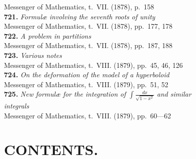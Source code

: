 \documentclass[12pt,a4paper,oneside]{book}
\theoremstyle{plain}
\theoremstyle{definition}
\theoremstyle{remark}
\begin{document}
\hspace*{2em}Messenger of Mathematics, t.~VII. (1878), p.~158\\[0.3em]
\textbf{721.} \textit{Formul\ae{} involving the seventh roots of unity} \\
\hspace*{2em}Messenger of Mathematics, t.~VII. (1878), pp.~177, 178\\[0.3em]
\textbf{722.} \textit{A problem in partitions} \\
\hspace*{2em}Messenger of Mathematics, t.~VII. (1878), pp.~187, 188\\[0.3em]
\textbf{723.} \textit{Various notes} \\
\hspace*{2em}Messenger of Mathematics, t.~VIII. (1879), pp.~45, 46, 126\\[0.3em]
\textbf{724.} \textit{On the deformation of the model of a hyperboloid} \\
\hspace*{2em}Messenger of Mathematics, t.~VIII. (1879), pp.~51, 52\\[0.3em]
\textbf{725.} \textit{New formul\ae{} for the integration of $\int \frac{dx}{\sqrt{1-x^2}}$ and similar}\\
\hspace*{2em}\textit{integrals} \\
\hspace*{2em}Messenger of Mathematics, t.~VIII. (1879), pp.~60---62

\cleardoublepage

\chapter*{CONTENTS.}
\end{document}
